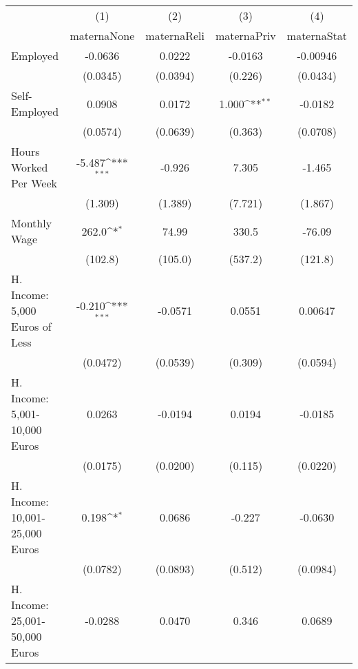 {
\def\sym#1{\ifmmode^{#1}\else\(^{#1}\)\fi}
\begin{tabular}{l*{4}{c}}
\hline\hline
            &\multicolumn{1}{c}{(1)}&\multicolumn{1}{c}{(2)}&\multicolumn{1}{c}{(3)}&\multicolumn{1}{c}{(4)}\\
            &\multicolumn{1}{c}{maternaNone}&\multicolumn{1}{c}{maternaReli}&\multicolumn{1}{c}{maternaPriv}&\multicolumn{1}{c}{maternaStat}\\
\hline
Employed    &     -0.0636         &      0.0222         &     -0.0163         &    -0.00946         \\
            &    (0.0345)         &    (0.0394)         &     (0.226)         &    (0.0434)         \\
[1em]
Self-Employed&      0.0908         &      0.0172         &       1.000\sym{**} &     -0.0182         \\
            &    (0.0574)         &    (0.0639)         &     (0.363)         &    (0.0708)         \\
[1em]
Hours Worked Per Week&      -5.487\sym{***}&      -0.926         &       7.305         &      -1.465         \\
            &     (1.309)         &     (1.389)         &     (7.721)         &     (1.867)         \\
[1em]
Monthly Wage&       262.0\sym{*}  &       74.99         &       330.5         &      -76.09         \\
            &     (102.8)         &     (105.0)         &     (537.2)         &     (121.8)         \\
[1em]
H. Income: 5,000 Euros of Less&      -0.210\sym{***}&     -0.0571         &      0.0551         &     0.00647         \\
            &    (0.0472)         &    (0.0539)         &     (0.309)         &    (0.0594)         \\
[1em]
H. Income: 5,001-10,000 Euros&      0.0263         &     -0.0194         &      0.0194         &     -0.0185         \\
            &    (0.0175)         &    (0.0200)         &     (0.115)         &    (0.0220)         \\
[1em]
H. Income: 10,001-25,000 Euros&       0.198\sym{*}  &      0.0686         &      -0.227         &     -0.0630         \\
            &    (0.0782)         &    (0.0893)         &     (0.512)         &    (0.0984)         \\
[1em]
H. Income: 25,001-50,000 Euros&     -0.0288         &      0.0470         &       0.346         &      0.0689         \\

\end{tabular}}
